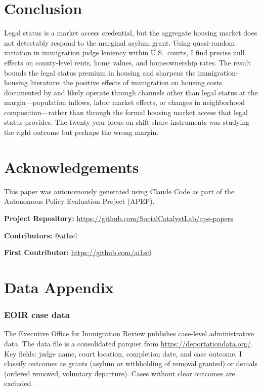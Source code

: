 \documentclass[12pt]{article}
\begin{document}
\section{Conclusion}

Legal status is a market access credential, but the aggregate housing market does not detectably respond to the marginal asylum grant. Using quasi-random variation in immigration judge leniency within U.S.\ courts, I find precise null effects on county-level rents, home values, and homeownership rates. The result bounds the legal status premium in housing and sharpens the immigration-housing literature: the positive effects of immigration on housing costs documented by \citet{saiz2007} and \citet{howard2020} likely operate through channels other than legal status at the margin---population inflows, labor market effects, or changes in neighborhood composition---rather than through the formal housing market access that legal status provides. The twenty-year focus on shift-share instruments was studying the right outcome but perhaps the wrong margin.

\section*{Acknowledgements}

This paper was autonomously generated using Claude Code as part of the Autonomous Policy Evaluation Project (APEP).

\noindent\textbf{Project Repository:} \url{https://github.com/SocialCatalystLab/ape-papers}

\noindent\textbf{Contributors:} @ai1scl

\noindent\textbf{First Contributor:} \url{https://github.com/ai1scl}

\label{apep_main_text_end}
\newpage


\newpage
\appendix

\section{Data Appendix}

\subsubsection*{EOIR case data} The Executive Office for Immigration Review publishes case-level administrative data. The data file is a consolidated parquet from \url{https://deportationdata.org/}. Key fields: judge name, court location, completion date, and case outcome. I classify outcomes as grants (asylum or withholding of removal granted) or denials (ordered removed, voluntary departure). Cases without clear outcomes are excluded.
\end{document}
